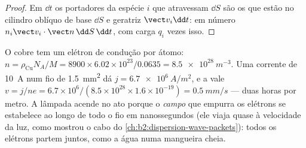 \begin{proof}
Em $\dd t$ os portadores da espécie $i$ que atravessam $\dd S$ são os que estão no
cilindro oblíquo de base $\dd S$ e geratriz $\vect v_i\dd t$: em número
$n_i\vect v_i\cdot\vect n\,\dd S\,\dd t$, com carga $q_i$ vezes isso.
\end{proof}

\begin{example}\label{ex:b2:charges-currents-conduction:drift}
O cobre tem um elétron de condução por átomo: $n = \rho_{\text{Cu}}N_A/M =
8900 \times 6.02 \times 10^{23}/0.0635 = \qty{8.5e28}{m^{-3}}$. Uma corrente de
\qty{10}{A} num fio de \qty{1.5}{mm^2} dá $j = \qty{6.7e6}{A/m^2}$, e a
\emph{} vale $v = j/ne = 6.7 \times 10^6/(8.5 \times 10^{28} \times 1.6 \times
10^{-19}) = \qty{0.5}{mm/s}$ --- duas horas por metro. A lâmpada acende no
ato porque o \emph{campo} que empurra os elétrons se estabelece
ao longo de todo o fio em nanossegundos (ele viaja quase à
velocidade da luz, como mostrou o cabo do \cref{ch:b2:dispersion-wave-packets}):
todos os elétrons partem juntos, como a água numa mangueira cheia.
\end{example}

